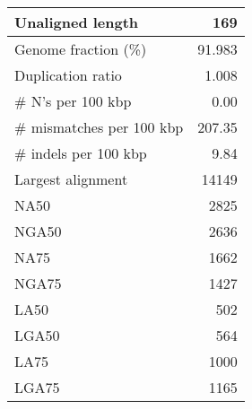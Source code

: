 \documentclass[12pt,a4paper]{article}
\begin{document}
\begin{table}[ht]
\begin{center}
\begin{tabular}{|l*{1}{|r}|}
Unaligned length & 169 \\ \hline
Genome fraction (\%) & 91.983 \\ \hline
Duplication ratio & 1.008 \\ \hline
\# N's per 100 kbp & 0.00 \\ \hline
\# mismatches per 100 kbp & 207.35 \\ \hline
\# indels per 100 kbp & 9.84 \\ \hline
Largest alignment & 14149 \\ \hline
NA50 & 2825 \\ \hline
NGA50 & 2636 \\ \hline
NA75 & 1662 \\ \hline
NGA75 & 1427 \\ \hline
LA50 & 502 \\ \hline
LGA50 & 564 \\ \hline
LA75 & 1000 \\ \hline
LGA75 & 1165 \\ \hline
\end{tabular}
\end{center}
\end{table}
\end{document}
